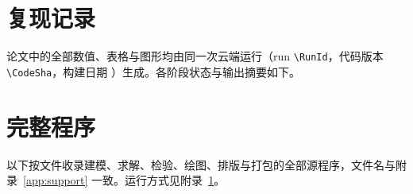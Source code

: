 \documentclass[UTF8,zihao=-4,fontset=none,a4paper]{ctexart}
\theoremstyle{definition}
\begin{document}
\section{复现记录}
\label{app:repro}
论文中的全部数值、表格与图形均由同一次云端运行（run \nolinkurl{\RunId}，代码版本 \nolinkurl{\CodeSha}，构建日期 \BuildDate）生成。各阶段状态与输出摘要如下。



\section{完整程序}
\label{app:code}
以下按文件收录建模、求解、检验、绘图、排版与打包的全部源程序，文件名与附录~\ref{app:support} 一致。运行方式见附录~\ref{app:repro}。

\end{document}
